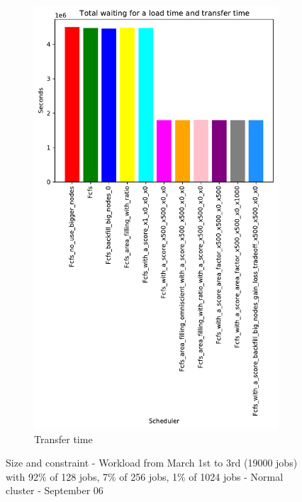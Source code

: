 \documentclass[a4paper]{article}
\begin{document}
\begin{figure}[H]
\begin{subfigure}[b]{0.4\linewidth}\centering\includegraphics[width=0.7\linewidth]{MBSS/plot/Results_Size_And_Data_2022-03-01->2022-03-03_V9271_Total_waiting_for_a_load_time_and_transfer_time_450_128_32_256_4_1024.pdf}\caption{Transfer time}\label{45}\end{subfigure}
\caption{Size and constraint - Workload from March 1st to 3rd (19000 jobs) with 92\% of 128 jobs, 7\% of 256 jobs, 1\% of 1024 jobs - Normal cluster - September 06}\label{49}\end{figure}
\end{document}
